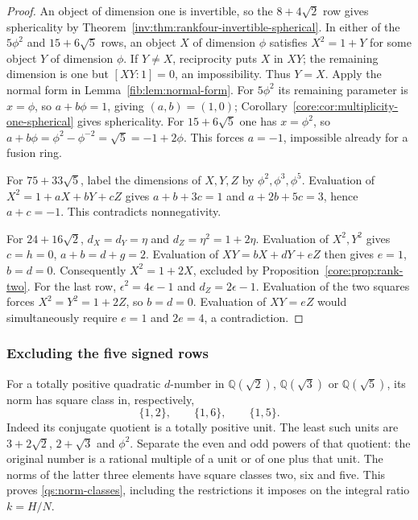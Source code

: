 \documentclass[11pt,a4paper]{article}
\theoremstyle{definition}\newtheorem{definition}[theorem]{Definition}
\theoremstyle{remark}\newtheorem{remark}[theorem]{Remark}
\newcommand{\Q}{\mathbb Q}
\numberwithin{equation}{section}
\begin{document}
\begin{proof}
An object of dimension one is invertible, so the $8+4\sqrt2$ row gives
sphericality by Theorem~\ref{inv:thm:rankfour-invertible-spherical}.
In either of the $5\phi^2$ and $15+6\sqrt5$ rows,
an object $X$ of dimension $\phi$ satisfies $X^2=1+Y$ for some object
$Y$ of dimension $\phi$. If $Y\ne X$, reciprocity puts $X$ in $XY$;
the remaining dimension is one but $[XY:1]=0$, an impossibility.
Thus $Y=X$. Apply the normal form in
Lemma~\ref{fib:lem:normal-form}. For $5\phi^2$ its remaining
parameter is $x=\phi$, so $a+b\phi=1$, giving $(a,b)=(1,0)$;
Corollary~\ref{core:cor:multiplicity-one-spherical} gives sphericality.
For $15+6\sqrt5$ one has $x=\phi^2$, so
$a+b\phi=\phi^2-\phi^{-2}=\sqrt5=-1+2\phi$.
This forces $a=-1$, impossible already for a fusion ring.

For $75+33\sqrt5$, label the dimensions of $X,Y,Z$ by
$\phi^2,\phi^3,\phi^5$. Evaluation of
$X^2=1+aX+bY+cZ$ gives
$a+b+3c=1$ and $a+2b+5c=3$, hence $a+c=-1$.
This contradicts nonnegativity.

For $24+16\sqrt2$, $d_X=d_Y=\eta$ and $d_Z=\eta^2=1+2\eta$.
Evaluation of $X^2,Y^2$ gives $c=h=0$, $a+b=d+g=2$.
Evaluation of $XY=bX+dY+eZ$ then gives $e=1$, $b=d=0$.
Consequently $X^2=1+2X$, excluded by
Proposition~\ref{core:prop:rank-two}.
For the last row, $\epsilon^2=4\epsilon-1$ and $d_Z=2\epsilon-1$.
Evaluation of the two squares forces $X^2=Y^2=1+2Z$, so
$b=d=0$. Evaluation of $XY=eZ$ would simultaneously require
$e=1$ and $2e=4$, a contradiction.
\end{proof}

\subsubsection{Excluding the five signed rows}

For a totally positive quadratic $d$-number in
$\Q(\sqrt2)$, $\Q(\sqrt3)$ or $\Q(\sqrt5)$,
its norm has square class in, respectively,
\begin{equation}\label{qs:norm-classes}
 \{1,2\},\qquad\{1,6\},\qquad\{1,5\}.
\end{equation}
Indeed its conjugate quotient is a totally positive unit. The least
such units are $3+2\sqrt2$, $2+\sqrt3$ and $\phi^2$. Separate the
even and odd powers of that quotient: the original number is a rational
multiple of a unit or of one plus that unit. The norms of the latter
three elements have square classes two, six and five. This proves
\eqref{qs:norm-classes}, including the restrictions it imposes on the
integral ratio $k=H/N$.
\end{document}
